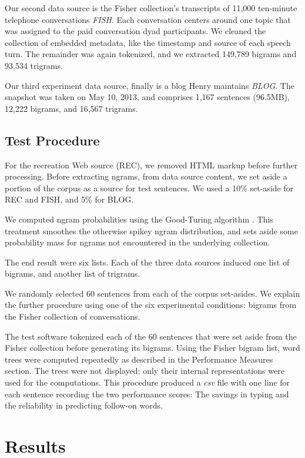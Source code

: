\documentclass{sigchi}
\begin{document}
Our second data source is the Fisher collection's transcripts of
11,000 ten-minute telephone conversations {\em FISH}. Each
conversation centers around one topic that was assigned to the paid
conversation dyad participants. We cleaned the collection of embedded
metadata, like the timestamp and source of each speech turn. The
remainder was again tokenized, and we extracted 149,789 bigrams and
93,534 trigrams.

Our third experiment data source, finally is a blog Henry maintains
{\em BLOG}. The snapshot was taken on May 10, 2013, and comprises
1,167 sentences (96.5MB), 12,222 bigrams, and 16,567 trigrams.

\subsection{Test Procedure}

For the recreation Web source (REC), we removed HTML markup before
further processing. Before extracting ngrams, from data source
content, we set aside a portion of the corpus as a source for test
sentences. We used a 10\% set-aside for REC and FISH, and 5\% for
BLOG.

We computed ngram probabilities using the Good-Turing algorithm
\cite{Gale95good-turingsmoothing}. This treatment smoothes the
otherwise spikey ngram distribution, and sets aside some probability
mass for ngrams not encountered in the underlying collection.

The end result were six lists. Each of the three data sources induced
one list of bigrams, and another list of trigrams. 

We randomly selected 60 sentences from each of the corpus set-asides.
We explain the further procedure using one of the six experimental
conditions: bigrams from the Fisher collection of conversations.

The test software tokenized each of the 60 sentences that were set
aside from the Fisher collection before generating its bigrams. Using
the Fisher bigram list, word trees were computed repeatedly as
described in the Performance Measures section. The trees were not
displayed; only their internal representations were used for the
computations. This procedure produced a {\em csv} file with one line
for each sentence recording the two performance scores: The savings in
typing and the reliability in predicting follow-on words.

\section{Results}
\end{document}
